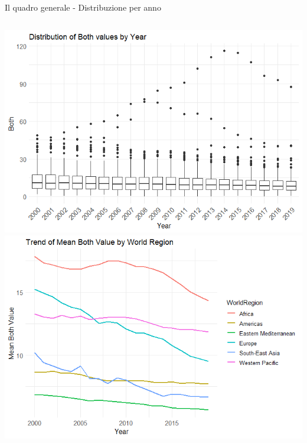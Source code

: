 \documentclass{beamer}
\begin{document}
\begin{frame}{Il quadro generale - Distribuzione per anno}
	\begin{columns}
			\includegraphics[width=\linewidth]{Images/3 - Boxyears2.png}
			\includegraphics[width=\linewidth]{Images/4 - WRTrend2.png}
	\end{columns}
\end{frame}
\end{document}
